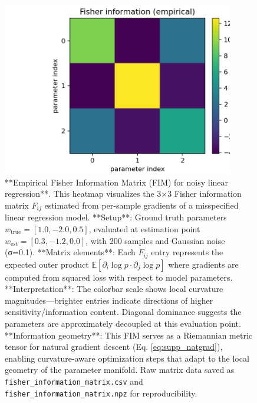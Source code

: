 \documentclass[
  10pt,
]{article}
\begin{document}
\begin{figure}[htbp]
\centering
\includegraphics[width=0.9\textwidth]{figures/fisher_information_matrix.png}
\caption{**Empirical Fisher Information Matrix (FIM) for noisy linear regression**. This heatmap visualizes the 3×3 Fisher information matrix $F_{ij}$ estimated from per-sample gradients of a misspecified linear regression model. **Setup**: Ground truth parameters $w_{\text{true}} = [1.0, -2.0, 0.5]$, evaluated at estimation point $w_{\text{est}} = [0.3, -1.2, 0.0]$, with 200 samples and Gaussian noise (σ=0.1). **Matrix elements**: Each $F_{ij}$ entry represents the expected outer product $\mathbb{E}[\partial_i \log p \cdot \partial_j \log p]$ where gradients are computed from squared loss with respect to model parameters. **Interpretation**: The colorbar scale shows local curvature magnitudes—brighter entries indicate directions of higher sensitivity/information content. Diagonal dominance suggests the parameters are approximately decoupled at this evaluation point. **Information geometry**: This FIM serves as a Riemannian metric tensor for natural gradient descent (Eq. \ref{eq:supp_natgrad}), enabling curvature-aware optimization steps that adapt to the local geometry of the parameter manifold. Raw matrix data saved as \texttt{fisher\_information\_matrix.csv} and \texttt{fisher\_information\_matrix.npz} for reproducibility.}
\label{fig:fisher_information_matrix}
\end{figure}
\end{document}
